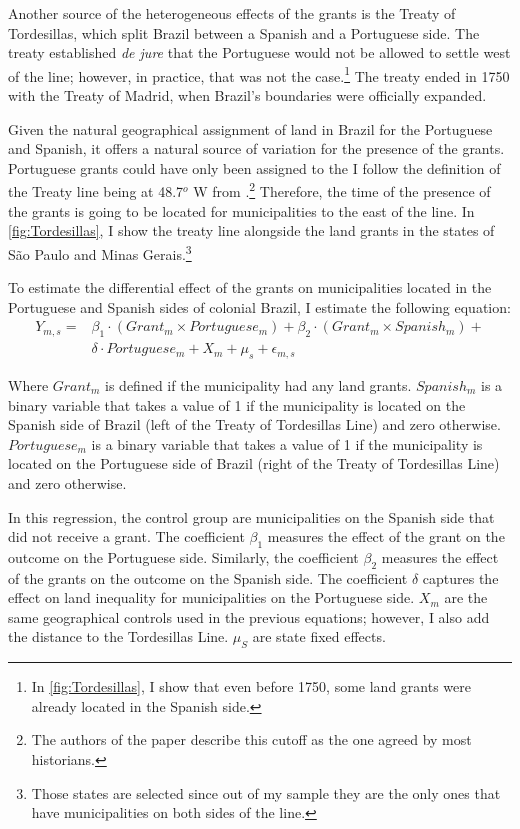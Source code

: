 \documentclass[11pt]{article}
\begin{document}
Another source of the heterogeneous effects of the grants is the Treaty of Tordesillas, which split Brazil between a Spanish and a Portuguese side. 
The treaty established \textit{de jure} that the Portuguese would not be allowed to settle west of the line; however, in practice, that was not the case.\footnote{In \autoref{fig:Tordesillas}, I show that even before 1750, some land grants were already located in the Spanish side.}
The treaty ended in 1750 with the Treaty of Madrid, when Brazil's boundaries were officially expanded.

Given the natural geographical assignment of land in Brazil for the Portuguese and Spanish, it offers a natural source of variation for the presence of the grants.
Portuguese grants could have only been assigned to the 
I follow the definition of the Treaty line being at 48.7$^o$ W from  \textcite{Laudares2023-wl}.\footnote{The authors of the paper describe this cutoff as the one agreed by most historians.}
Therefore, the time of the presence of the grants is going to be located for municipalities to the east of the line.
In \autoref{fig:Tordesillas}, I show the treaty line alongside the land grants in the states of São Paulo and Minas Gerais.\footnote{Those states are selected since out of my sample they are the only ones that have municipalities on both sides of the line.}

To estimate the differential effect of the grants on municipalities located in the Portuguese and Spanish sides of colonial Brazil, I estimate the following equation:
\begin{equation}
  \label{eqn:tordesillas}
  \begin{split}
  Y_{m,s} = & \beta_1 \cdot (Grant_m  \times Portuguese_m) + \beta_2 \cdot (Grant_m \times Spanish_m) + \\
  & \delta \cdot  Portuguese_m + X_{m} + \mu_s + \epsilon_{m,s}
  \end{split}
\end{equation}

Where $Grant_m$ is defined if the municipality had any land grants. 
$Spanish_m$ is a binary variable that takes a value of 1 if the municipality is located on the Spanish side of Brazil (left of the Treaty of Tordesillas Line) and zero otherwise.
$Portuguese_m$ is a binary variable that takes a value of 1 if the municipality is located on the Portuguese side of Brazil (right of the Treaty of Tordesillas Line) and zero otherwise. 

In this regression, the control group are municipalities on the Spanish side that did not receive a grant.
The coefficient $\beta_1$ measures the effect of the grant on the outcome on the Portuguese side. 
Similarly, the coefficient $\beta_2$ measures the effect of the grants on the outcome on the Spanish side.
The coefficient $\delta$ captures the effect on land inequality for municipalities on the Portuguese side.
$X_m$ are the same geographical controls used in the previous equations; however, I also add the distance to the Tordesillas Line.
$\mu_S$ are state fixed effects.
\end{document}
